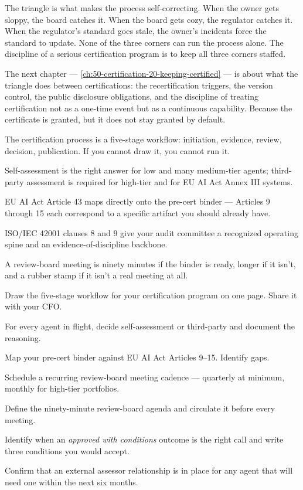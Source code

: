 The triangle is what makes the process self-correcting. When the owner gets sloppy, the board catches it. When the board gets cozy, the regulator catches it. When the regulator's standard goes stale, the owner's incidents force the standard to update. None of the three corners can run the process alone. The discipline of a serious certification program is to keep all three corners staffed.

The next chapter --- \autoref{ch:50-certification-20-keeping-certified} --- is about what the triangle does between certifications: the recertification triggers, the version control, the public disclosure obligations, and the discipline of treating certification not as a one-time event but as a continuous capability. Because the certificate is granted, but it does not stay granted by default.

\TNrule

\stoptwocol

\begin{TNkeytakeaways}
\item The certification process is a five-stage workflow: initiation, evidence, review, decision, publication. If you cannot draw it, you cannot run it.
\item Self-assessment is the right answer for low and many medium-tier agents; third-party assessment is required for high-tier and for EU AI Act Annex III systems.
\item EU AI Act Article 43 maps directly onto the pre-cert binder --- Articles 9 through 15 each correspond to a specific artifact you should already have.
\item ISO/IEC 42001 clauses 8 and 9 give your audit committee a recognized operating spine and an evidence-of-discipline backbone.
\item A review-board meeting is ninety minutes if the binder is ready, longer if it isn't, and a rubber stamp if it isn't a real meeting at all.
\end{TNkeytakeaways}

\begin{TNchecklist}
\item Draw the five-stage workflow for your certification program on one page. Share it with your CFO.
\item For every agent in flight, decide self-assessment or third-party and document the reasoning.
\item Map your pre-cert binder against EU AI Act Articles 9--15. Identify gaps.
\item Schedule a recurring review-board meeting cadence --- quarterly at minimum, monthly for high-tier portfolios.
\item Define the ninety-minute review-board agenda and circulate it before every meeting.
\item Identify when an \textit{approved with conditions} outcome is the right call and write three conditions you would accept.
\item Confirm that an external assessor relationship is in place for any agent that will need one within the next six months.
\end{TNchecklist}



